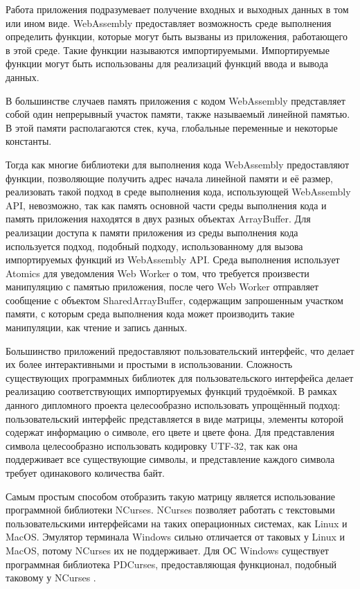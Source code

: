 Работа приложения подразумевает получение входных и выходных данных в том или ином виде.
WebAssembly предоставляет возможность среде выполнения определить функции, которые могут быть вызваны из приложения, работающего в этой среде.
Такие функции называются импортируемыми.
Импортируемые функции могут быть использованы для реализаций функций ввода и вывода данных.

В большинстве случаев память приложения с кодом WebAssembly представляет собой один непрерывный участок памяти, также называемый линейной памятью.
В этой памяти располагаются стек, куча, глобальные переменные и некоторые константы.

Тогда как многие библиотеки для выполнения кода WebAssembly предоставляют функции, позволяющие получить адрес начала линейной памяти и её размер, реализовать такой подход в среде выполнения кода, использующей WebAssembly API, невозможно, так как память основной части среды выполнения кода и память приложения находятся в двух разных объектах ArrayBuffer. 
Для реализации доступа к памяти приложения из среды выполнения кода используется подход, подобный подходу, использованному для вызова импортируемых функций из WebAssembly API.
Среда выполнения использует Atomics для уведомления Web Worker о том, что требуется произвести манипуляцию с памятью приложения, после чего Web Worker отправляет сообщение с объектом SharedArrayBuffer, содержащим запрошенным участком памяти, с которым среда выполнения кода может производить такие манипуляции, как чтение и запись данных.

Большинство приложений предоставляют пользовательский интерфейс, что делает их более интерактивными и простыми в использовании.
Сложность существующих программных библиотек для пользовательского интерфейса делает реализацию соответствующих импортируемых функций трудоёмкой.
В рамках данного дипломного проекта целесообразно использовать упрощённый подход: пользовательский интерфейс представляется в виде матрицы, элементы которой содержат информацию о символе, его цвете и цвете фона.
Для представления символа целесообразно использовать кодировку UTF-32, так как она поддерживает все существующие символы, и представление каждого символа требует одинакового количества байт.

Самым простым способом отобразить такую матрицу является использование программной библиотеки NCurses.
NCurses позволяет работать с текстовыми пользовательскими интерфейсами на таких операционных системах, как Linux и MacOS.
Эмулятор терминала Windows сильно отличается от таковых у Linux и MacOS, потому NCurses их не поддерживает.
Для ОС Windows существует программная библиотека PDCurses, предоставляющая функционал, подобный таковому у NCurses \cite{PDCurses}.

